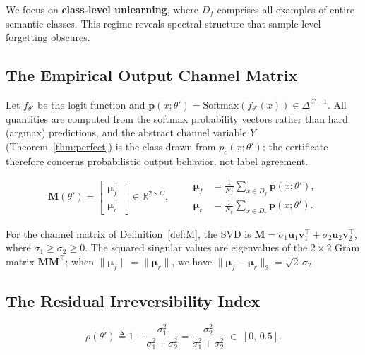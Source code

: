 \documentclass[smallextended]{svjour3}       %
\newcommand{\coloneqq}{\triangleq}
\begin{document}
We focus on \textbf{class-level unlearning}, where $D_f$ comprises all examples of entire semantic classes. This regime reveals spectral structure that sample-level forgetting obscures.

\subsection{The Empirical Output Channel Matrix}

Let $f_{\theta'}$ be the logit function and $\mathbf{p}(x;\theta') = \mathrm{Softmax}(f_{\theta'}(x)) \in \Delta^{C-1}$. All quantities are computed from the softmax probability vectors rather than hard (argmax) predictions, and the abstract channel variable $Y$ (Theorem~\ref{thm:perfect}) is the class drawn from $p_c(x;\theta')$; the certificate therefore concerns probabilistic output behavior, not label agreement.

\begin{definition}
\label{def:M}
\begin{equation}
\mathbf{M}(\theta') =
\begin{bmatrix}
\boldsymbol{\mu}_f^\top \\ \boldsymbol{\mu}_r^\top
\end{bmatrix}
\in \mathbb{R}^{2\times C},
\qquad
\begin{aligned}
\boldsymbol{\mu}_f &= \frac{1}{N_f}\sum_{x\in D_f} \mathbf{p}(x;\theta'),\\
\boldsymbol{\mu}_r &= \frac{1}{N_r}\sum_{x\in D_r} \mathbf{p}(x;\theta').
\end{aligned}
\end{equation}
\end{definition}

For the channel matrix of Definition~\ref{def:M}, the SVD is $\mathbf{M} = \sigma_1 \mathbf{u}_1 \mathbf{v}_1^\top + \sigma_2 \mathbf{u}_2 \mathbf{v}_2^\top$, where $\sigma_1 \ge \sigma_2 \ge 0$. The squared singular values are eigenvalues of the $2\times 2$ Gram matrix $\mathbf{M}\mathbf{M}^\top$; when $\|\boldsymbol{\mu}_f\| = \|\boldsymbol{\mu}_r\|$, we have $\|\boldsymbol{\mu}_f - \boldsymbol{\mu}_r\|_2 = \sqrt{2}\,\sigma_2$.

\subsection{The Residual Irreversibility Index}

\begin{definition}[RII]
\label{def:rii}
\begin{equation}
\rho(\theta') \coloneqq 1 - \frac{\sigma_1^2}{\sigma_1^2 + \sigma_2^2}
= \frac{\sigma_2^2}{\sigma_1^2 + \sigma_2^2}
\;\in\; [0,\,0.5].
\label{eq:rho}
\end{equation}
\end{definition}
\end{document}
